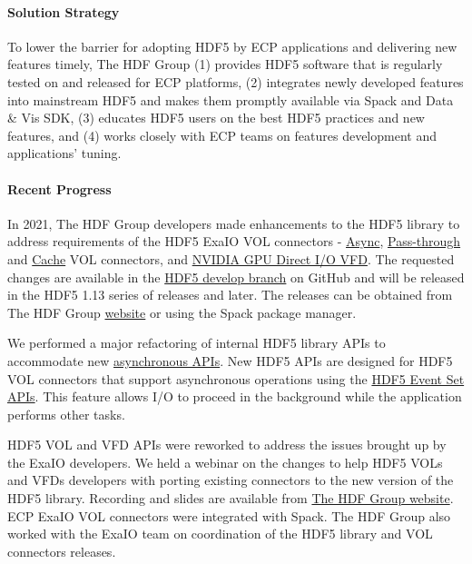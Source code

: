 \paragraph{Solution Strategy}
To lower the barrier for adopting HDF5 by ECP applications and delivering new features timely, The HDF Group (1) provides HDF5 software that is regularly tested on and released for ECP platforms, (2) integrates newly developed features into mainstream HDF5 and makes them promptly available via Spack and Data \& Vis SDK, (3) educates HDF5 users on the best HDF5 practices and new features, and (4) works closely with ECP teams on features development and applications’ tuning. 

\paragraph{Recent Progress}
In 2021, The HDF Group developers made enhancements to the HDF5 library to address requirements of the HDF5 ExaIO VOL connectors - \href{https://github.com/hpc-io/vol-async}{Async}, \href{https://github.com/hpc-io/vol-external-passthrough}{Pass-through} and \href{https://github.com/hpc-io/vol-cache}{Cache} VOL connectors, and \href{https://github.com/hpc-io/vfd-gds}{NVIDIA GPU Direct I/O VFD}. The requested changes are available in the \href{https://github.com/HDFGroup/hdf5}{HDF5 develop branch} on GitHub and will be released in the HDF5 1.13 series of releases and later. The releases can be obtained from The HDF Group \href{https://portal.hdfgroup.org/display/support/Downloads}{website} or using the Spack package manager.  

We performed a major refactoring of internal HDF5 library APIs to accommodate new \href{https://portal.hdfgroup.org/display/HDF5/Asynchronous+operations+with+HDF5+VOL+connectors}{asynchronous APIs}.  New HDF5 APIs are designed for HDF5 VOL connectors that support asynchronous operations using the \href{https://portal.hdfgroup.org/display/HDF5/Event+Set}{HDF5 Event Set APIs}. This feature allows I/O to proceed in the background while the application performs other tasks. 

HDF5 VOL and VFD APIs were reworked to address the issues brought up by the ExaIO developers. We held a webinar on the changes to help HDF5 VOLs and VFDs developers with porting existing connectors to the new version of the HDF5 library. Recording and slides are available from \href{https://www.hdfgroup.org/2021/09/webinar-followup-new-features-in-the-hdf5-1-13-0-release/}{The HDF Group website}. 
ECP ExaIO VOL connectors were integrated with Spack. The HDF Group also worked with the ExaIO team on coordination of the HDF5 library and VOL connectors releases.

